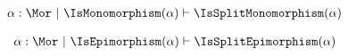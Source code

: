
\begin{sequent}
\begin{align*}
  \alpha:\Mor ~|~ \IsMonomorphism( \alpha ) \vdash \IsSplitMonomorphism( \alpha )
\end{align*}
\end{sequent}

\begin{sequent}
\begin{align*}
  \alpha:\Mor ~|~ \IsEpimorphism( \alpha ) \vdash \IsSplitEpimorphism( \alpha )
\end{align*}
\end{sequent}


